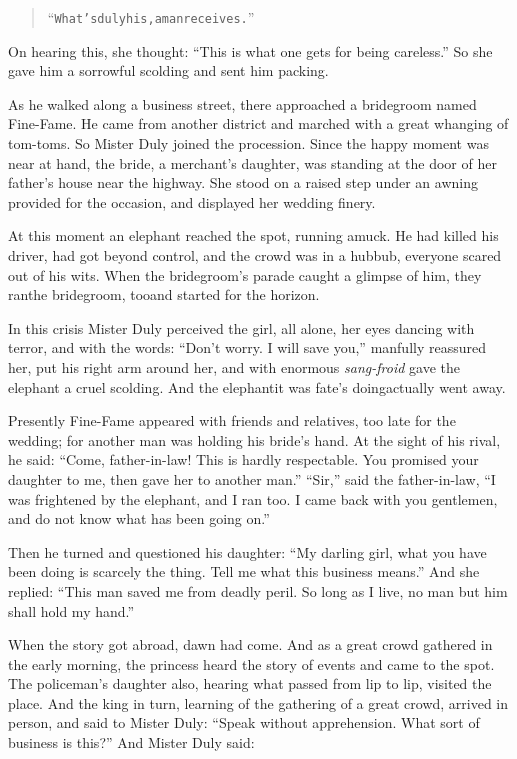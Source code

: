 \documentclass[article, twoside, 14pt]{memoir}
\renewenvironment{verbatim}{%
\begin{quote}%
\vskip -10pt%
\begin{alltt}\normalfont\large}{\end{alltt}%
\end{quote}%
\vskip -10pt
} %
\begin{document}
\begin{verbatim}
“What's duly his, a man receives.”
\end{verbatim}
On hearing this, she thought:
``This is what one gets for being careless.'' So she gave him a
sorrowful scolding and sent him packing.

As he walked along a business street, there approached a bridegroom
named Fine-Fame. He came from another district and marched with a
great whanging of tom-toms. So Mister Duly joined the procession.
Since the happy moment was near at hand, the bride, a merchant's
daughter, was standing at the door of her father's house near the
highway. She stood on a raised step under an awning provided for
the occasion, and displayed her wedding finery.

At this moment an elephant reached the spot, running amuck. He had
killed his driver, had got beyond control, and the crowd was in a
hubbub, everyone scared out of his wits. When the bridegroom's
parade caught a glimpse of him, they ran{\textemdash}the bridegroom,
too{\textemdash}and started for the horizon.

In this crisis Mister Duly perceived the girl, all alone, her eyes
dancing with terror, and with the words:
``Don't worry. I will save you,'' manfully reassured her, put his
right arm around her, and with enormous \emph{sang-froid} gave the
elephant a cruel scolding. And the elephant{\textemdash}it was fate's
doing{\textemdash}actually went away.

Presently Fine-Fame appeared with friends and relatives, too late
for the wedding; for another man was holding his bride's hand. At
the sight of his rival, he said:
``Come, father-in-law! This is hardly respectable. You promised your daughter to me, then gave her to another man.''
``Sir,'' said the father-in-law,
``I was frightened by the elephant, and I ran too. I came back with you gentlemen, and do not know what has been going on.''

Then he turned and questioned his daughter:
``My darling girl, what you have been doing is scarcely the thing. Tell me what this business means.''
And she replied:
``This man saved me from deadly peril. So long as I live, no man but him shall hold my hand.''

When the story got abroad, dawn had come. And as a great
crowd gathered in the early morning, the princess heard the story
of events and came to the spot. The policeman's daughter also,
hearing what passed from lip to lip, visited the place. And the
king in turn, learning of the gathering of a great crowd, arrived
in person, and said to Mister Duly:
``Speak without apprehension. What sort of business is this?'' And
Mister Duly said:
\end{document}
